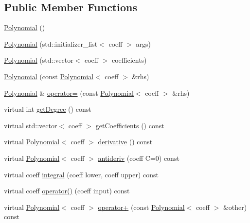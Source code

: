 \subsection*{Public Member Functions}
\begin{DoxyCompactItemize}
\item 
\hyperlink{class_alg_lib_1_1_polynomial_a33a0ad0b646bcf6b0295d597097fed85}{Polynomial} ()
\item 
\hyperlink{class_alg_lib_1_1_polynomial_a53075cc00bf37bcaf2ff6c8d18ec3206}{Polynomial} (std\+::initializer\+\_\+list$<$ coeff $>$ args)
\item 
\hyperlink{class_alg_lib_1_1_polynomial_ad75097bb323e32318e6b508532ebce7a}{Polynomial} (std\+::vector$<$ coeff $>$ coefficients)
\item 
\hyperlink{class_alg_lib_1_1_polynomial_af16630d7204b1bb4f4353682a851abdb}{Polynomial} (const \hyperlink{class_alg_lib_1_1_polynomial}{Polynomial}$<$ coeff $>$ \&rhs)
\item 
\hyperlink{class_alg_lib_1_1_polynomial}{Polynomial} \& \hyperlink{class_alg_lib_1_1_polynomial_adb6aa23b16a21e65973e771c9eddeed8}{operator=} (const \hyperlink{class_alg_lib_1_1_polynomial}{Polynomial}$<$ coeff $>$ \&rhs)
\item 
virtual int \hyperlink{class_alg_lib_1_1_polynomial_a788df01d92661cedc88ae68060670ce4}{get\+Degree} () const 
\item 
virtual std\+::vector$<$ coeff $>$ \hyperlink{class_alg_lib_1_1_polynomial_a815ce4eb1ae0edbb6981baab2489b636}{get\+Coefficients} () const 
\item 
virtual \hyperlink{class_alg_lib_1_1_polynomial}{Polynomial}$<$ coeff $>$ \hyperlink{class_alg_lib_1_1_polynomial_aae19d2ebb49d017d64a70c23c8294b4f}{derivative} () const 
\item 
virtual \hyperlink{class_alg_lib_1_1_polynomial}{Polynomial}$<$ coeff $>$ \hyperlink{class_alg_lib_1_1_polynomial_adba823edd7b425b451b2b550fe5727d0}{antideriv} (coeff C=0) const 
\item 
virtual coeff \hyperlink{class_alg_lib_1_1_polynomial_a81380711ec4e7c9be6f0a4bfc608c301}{integral} (coeff lower, coeff upper) const 
\item 
virtual coeff \hyperlink{class_alg_lib_1_1_polynomial_a07d802dde3e665ad427a6932fa99f691}{operator()} (coeff input) const 
\item 
virtual \hyperlink{class_alg_lib_1_1_polynomial}{Polynomial}$<$ coeff $>$ \hyperlink{class_alg_lib_1_1_polynomial_ad651de00803bc2bfc17f684dd6183e7e}{operator+} (const \hyperlink{class_alg_lib_1_1_polynomial}{Polynomial}$<$ coeff $>$ \&other) const 

\end{DoxyCompactItemize}
